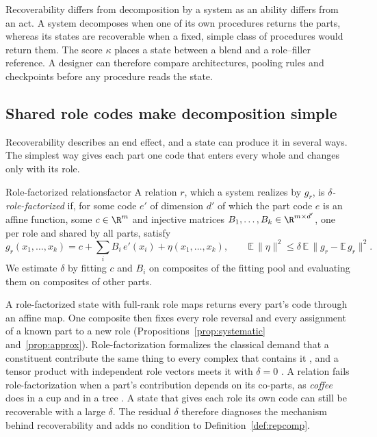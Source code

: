 Recoverability differs from decomposition by a system as an ability differs from an act. A system decomposes when one of its own procedures returns the parts, whereas its states are recoverable when a fixed, simple class of procedures would return them. The score $\kappa$ places a state between a blend and a role--filler reference. A designer can therefore compare architectures, pooling rules and checkpoints before any procedure reads the state.

\subsection{Shared role codes make decomposition simple}
\label{sec:mechanics}

Recoverability describes an end effect, and a state can produce it in several ways. The simplest way gives each part one code that enters every whole and changes only with its role.

\begin{defbox}{Role-factorized relations}{factor}
A relation $r$, which a system realizes by $g_r$, is \emph{$\delta$-role-factorized} if, for some code $e'$ of dimension $d'$ of which the part code $e$ is an affine function, some $c \in \R^m$ and injective matrices $B_1, \ldots, B_k \in \R^{m \times d'}$, one per role and shared by all parts, satisfy
\begin{equation}
  g_r(x_1, \ldots, x_k) = c + \textstyle\sum_{i} B_i\, e'(x_i) + \eta(x_1, \ldots, x_k), \qquad \mathbb{E}\,\lVert \eta \rVert^2 \le \delta\, \mathbb{E}\,\lVert g_r - \mathbb{E}\,g_r \rVert^2 .
  \label{eq:factor}
\end{equation}
We estimate $\delta$ by fitting $c$ and $B_i$ on composites of the fitting pool and evaluating them on composites of other parts.
\end{defbox}

A role-factorized state with full-rank role maps returns every part's code through an affine map. One composite then fixes every role reversal and every assignment of a known part to a new role (Propositions~\ref{prop:systematic} and~\ref{prop:approx}). Role-factorization formalizes the classical demand that a constituent contribute the same thing to every complex that contains it \citep{fodor1988}, and a tensor product with independent role vectors meets it with $\delta = 0$ \citep{smolensky1990}. A relation fails role-factorization when a part's contribution depends on its co-parts, as \emph{coffee} does in a cup and in a tree \citep{smolensky1988}. A state that gives each role its own code can still be recoverable with a large $\delta$. The residual $\delta$ therefore diagnoses the mechanism behind recoverability and adds no condition to Definition~\ref{def:repcomp}.

